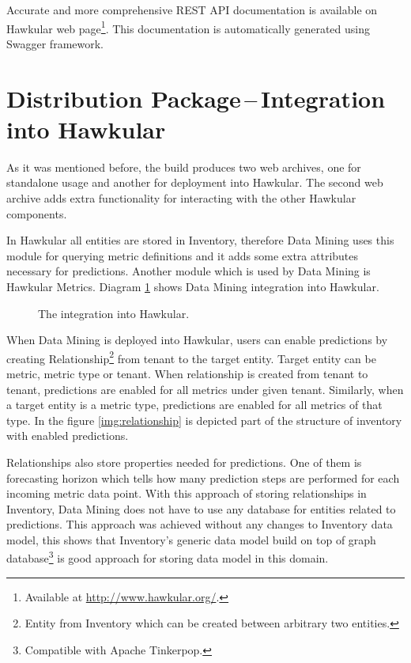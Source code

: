     Accurate and more comprehensive REST API documentation is available on Hawkular web page\footnote{Available at
    \url{http://www.hawkular.org/}.}. This documentation is automatically generated using Swagger framework.

    \section{Distribution Package\,--\,Integration into Hawkular} \label{sec:dist}
    As it was mentioned before, the build produces two web archives, one for standalone usage and another for
    deployment into Hawkular. The second web archive adds extra functionality for interacting with the other Hawkular
    components.

    In Hawkular all entities are stored in Inventory, therefore Data Mining uses this module
    for querying metric definitions and it adds some extra attributes necessary for predictions. Another module
    which is used by Data Mining is Hawkular Metrics. Diagram \ref{img:hawkular-interaction} shows Data Mining
    integration into Hawkular.

    \begin{figure}[H]
        \begin{center}
            \caption{The integration into Hawkular.}
            \label{img:hawkular-interaction}
        \end{center}
    \end{figure}

    When Data Mining is deployed into Hawkular, users can enable predictions by creating Relationship\footnote{Entity
    from Inventory which can be created between arbitrary two entities.} from tenant to the target entity. Target
    entity can be metric, metric type or tenant. When relationship is created from tenant to tenant, predictions are
    enabled for all metrics under given tenant. Similarly, when a target entity is a metric type, predictions are
    enabled for all metrics of that type. In the figure \ref{img:relationship} is depicted part of the structure of
    inventory with enabled predictions.

    Relationships also store properties needed for predictions. One of them is forecasting horizon which tells how
    many prediction steps are performed for each incoming metric data point. With this approach of storing
    relationships in Inventory, Data Mining does not have to use any database for entities related to predictions.
    This approach was achieved without any changes to Inventory data model, this shows that Inventory's generic data
    model build on top of graph database\footnote{Compatible with Apache Tinkerpop.} is good approach for storing data
    model in this domain.

